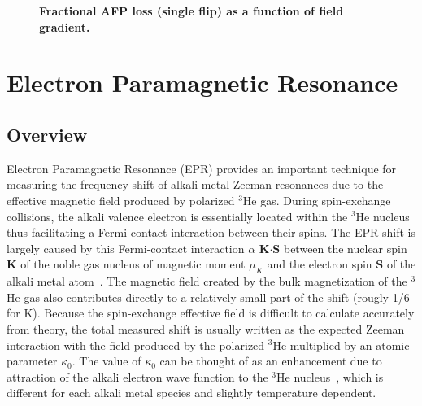 \begin{figure}[H]
	\centering
	\caption{{\bf Fractional AFP loss (single flip) as a function of field gradient.}}
	\label{AFPLossvsGradient}
\end{figure}

\section{Electron Paramagnetic Resonance}

\subsection{Overview}

Electron Paramagnetic Resonance (EPR) provides an important technique for measuring the frequency shift of alkali metal Zeeman resonances due to the effective magnetic field produced by polarized $^{3}$He gas. During spin-exchange collisions, the alkali valence electron is essentially located within the $^3$He nucleus thus facilitating a Fermi contact interaction between their spins. The EPR shift is largely caused by this Fermi-contact interaction $\alpha$ {\bf K$\cdot$S} between the nuclear spin {\bf K} of the noble gas nucleus of magnetic moment $\mu_{K}$ and the electron spin {\bf S} of the alkali metal atom~\cite{PhysRevA.71.013414}. The magnetic field created by the bulk magnetization of the $^{3}$He gas also contributes directly to a relatively small part of the shift (rougly 1/6 for K). Because the spin-exchange effective field is difficult to calculate accurately from theory, the total measured shift is usually written as the expected Zeeman interaction with the field produced by the polarized $^{3}$He multiplied by an atomic parameter $\kappa_{0}$. The value of $\kappa_0$ can be thought of as an enhancement due to attraction of the alkali electron wave function to the $^3$He nucleus~\cite{PhysRevA.58.3004}, which is different for each alkali metal species and slightly temperature dependent.

